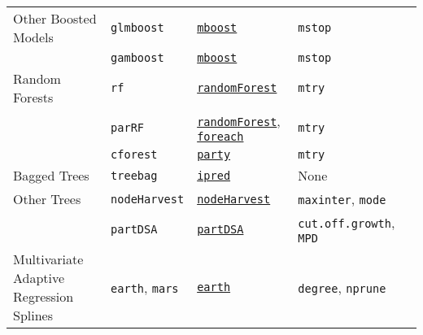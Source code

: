 \documentclass[12pt]{article}
\begin{document}
\begin{landscape}
\begin{longtable}{lllll}
      Other Boosted Models &
         \texttt{glmboost} & 
            {\tt \href{http://cran.r-project.org/web/packages/mboost/index.html}{mboost}}       &          
            \texttt{mstop}\\   
         &      
         \texttt{gamboost} & 
            {\tt \href{http://cran.r-project.org/web/packages/mboost/index.html}{mboost}}       &          
            \texttt{mstop}\\      

\rowcolor[rgb]{.95, .95, .95}                                        
      Random Forests & 
         \texttt{rf} & 
            {\tt \href{http://cran.r-project.org/web/packages/randomForest/index.html}{randomForest}}        & 
            \texttt{mtry} \\
\rowcolor[rgb]{.95, .95, .95}         
          & 
         \texttt{parRF} & 
             {\tt \href{http://cran.r-project.org/web/packages/randomForest/index.html}{randomForest}},  {\tt \href{http://cran.r-project.org/web/packages/foreach/index.html}{foreach}}        & 
            \texttt{mtry} \\              

\rowcolor[rgb]{.95, .95, .95}         
                   & 
         \texttt{cforest} & 
            {\tt \href{http://cran.r-project.org/web/packages/party/index.html}{party}}     & 
            \texttt{mtry} \\     
                        
      Bagged Trees &
         \texttt{treebag} & 
             {\tt \href{http://cran.r-project.org/web/packages/ipred/index.html}{ipred}}       & 
            None \\                         

\rowcolor[rgb]{.95, .95, .95}            
            Other Trees &
            \texttt{nodeHarvest} & 
             {\tt \href{http://cran.r-project.org/web/packages/nodeHarvest/index.html}{nodeHarvest}}       & 
            \texttt{maxinter}, \texttt{mode}  \\    

\rowcolor[rgb]{.95, .95, .95}         
            &
            \texttt{partDSA} & 
             {\tt \href{http://cran.r-project.org/web/packages/partDSA/index.html}{partDSA}}       & 
            \texttt{cut.off.growth}, \texttt{MPD}  \\     
            
      Multivariate Adaptive Regression Splines &
         \texttt{earth}, \texttt{mars} & 
             {\tt \href{http://cran.r-project.org/web/packages/earth/index.html}{earth}}      & 
            \texttt{degree}, \texttt{nprune} \\            


\end{longtable}
\end{landscape}
\end{document}

